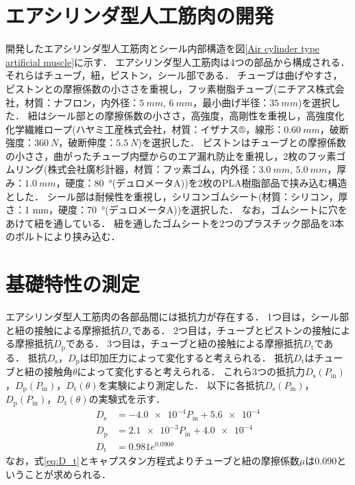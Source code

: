 \section{エアシリンダ型人工筋肉の開発}%
開発したエアシリンダ型人工筋肉とシール内部構造を図\ref{Air cylinder type artificial muscle}に示す．
エアシリンダ型人工筋肉は4つの部品から構成される．
それらはチューブ，紐，ピストン，シール部である．
チューブは曲げやすさ，ピストンとの摩擦係数の小ささを重視し，フッ素樹脂チューブ(ニチアス株式会社，材質：ナフロン\textregistered，内外径：$\SI{5}{mm}$, $\SI{6}{mm}$，最小曲げ半径：$\SI{35}{mm}$)を選択した．
紐はシール部との摩擦係数の小ささ，高強度，高剛性を重視し，高強度化化学繊維ロープ(ハヤミ工産株式会社，材質：イザナス®，線形：$\SI{0.60}{mm}$，破断強度：$\SI{360}{N}$，破断伸度：$\SI{5.5}{N}$)を選択した．
ピストンはチューブとの摩擦係数の小ささ，曲がったチューブ内壁からのエア漏れ防止を重視し，2枚のフッ素ゴムリング(株式会社廣杉計器，材質：フッ素ゴム，内外径：$\SI{3.0}{mm}$, $\SI{5.0}{mm}$，厚み：$\SI{1.0}{mm}$，硬度：\SI{80}{\degree}(デュロメータA))を2枚のPLA樹脂部品で挟み込む構造とした．
シール部は耐候性を重視し，シリコンゴムシート(材質：シリコン，厚さ：1 mm，硬度：\SI{70}{\degree}(デュロメータA))を選択した．
なお，ゴムシートに穴をあけて紐を通している．
紐を通したゴムシートを2つのプラスチック部品を3本のボルトにより挟み込む．

\section{基礎特性の測定}%
エアシリンダ型人工筋肉の各部品間には抵抗力が存在する．
1つ目は，シール部と紐の接触による摩擦抵抗$D_s$である．
2つ目は，チューブとピストンの接触による摩擦抵抗$D_\mathrm{p}$である．
3つ目は，チューブと紐の接触による摩擦抵抗$D_\mathrm{t}$である．
抵抗$D_\mathrm{s}$，$D_\mathrm{p}$は印加圧力によって変化すると考えられる．
抵抗$D_\mathrm{t}$はチューブと紐の接触角$\theta$によって変化すると考えられる．
これら3つの抵抗力$D_\mathrm{s}(P_\mathrm{in})$，$D_\mathrm{p}(P_\mathrm{in})$，$D_\mathrm{t}(\theta)$を実験により測定した．
以下に各抵抗$D_\mathrm{s}(P_\mathrm{in})$，$D_\mathrm{p}(P_\mathrm{in})$，$D_\mathrm{t}(\theta)$の実験式を示す．
\begin{align}
  D_\mathrm{s} & = \num{-4.0e-4}P_\mathrm{in} + \num{5.6e-4} \label{eq:D_s} \\
  D_\mathrm{p} & = \num{2.1e-3}P_\mathrm{in} + \num{4.0e-4}  \label{eq:D_p} \\
  D_\mathrm{t} & = 0.981e^{0.090\theta}\label{eq:D_t}
\end{align}
なお，式\eqref{eq:D_t}とキャプスタン方程式よりチューブと紐の摩擦係数$\mu$は0.090ということが求められる．

